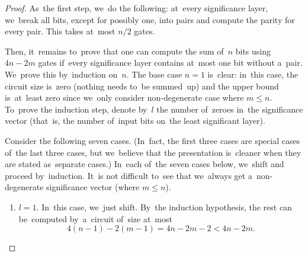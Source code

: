 \documentclass[a4paper, UKenglish, cleveref, autoref,  thm-restate, anonymous]{lipics-v2021}
\begin{document}
    \begin{proof}
        As~the first step, we~do the following: at~every significance layer,
        we~break all bits, except for possibly one, into pairs and compute
        the parity for every pair. This takes at~most $n/2$ gates.

        \begin{center}
        \end{center}

        Then, it~remains to~prove that one can compute the sum of~$n$ bits
        using $4n-2m$ gates if~every significance layer contains at~most one bit
        without a~pair. We~prove this by~induction on~$n$. The base case $n=1$ is~clear: in~this case, the circuit size is~zero (nothing needs to~be summed~up) and the upper bound is~at~least zero since we~only consider
        non-degenerate case where $m \le n$. To~prove the induction step,
        denote by~$l$ the number of~zeroes in~the significance
        vector (that~is, the number of~input bits on~the least significant layer).


        Consider the following seven cases. (In~fact, the first three cases are special cases of~the last three cases, but we~believe that the presentation is~cleaner when they are stated
        as~separate cases.)
        In~each of~the seven cases below, we~shift and proceed by~induction.
        It~is not difficult to~see that we~always get a~non-degenerate significance
        vector (where $m \le n$).

        \begin{enumerate}
            \item $l=1$. In~this case, we~just shift.
            By~the induction hypothesis, the rest can be~computed by~a~circuit
            of~size at~most
            \[4(n-1)-2(m-1)=4n-2m-2<4n-2m.\]


\end{enumerate}
\end{proof}
\end{document}
